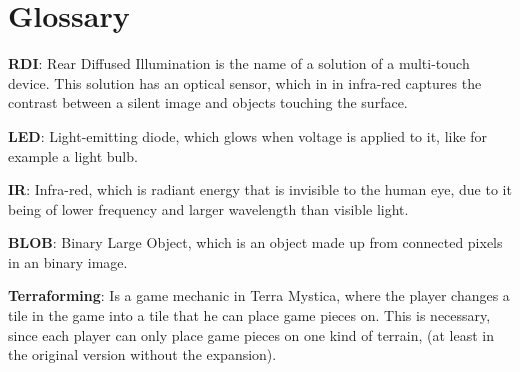 \chapter*{Glossary}\label{gloss}

\textbf{RDI}: Rear Diffused Illumination is the name of a solution of a multi-touch device\citep{multiTT}. This solution has an optical sensor, which in in infra-red captures the contrast between a silent image and objects touching the surface. 

\textbf{LED}: Light-emitting diode, which glows when voltage is applied to it, like for example a light bulb.

\textbf{IR}: Infra-red, which is radiant energy that is invisible to the human eye, due to it being of lower frequency and larger wavelength than visible light.

\textbf{BLOB}: Binary Large Object, which is an object made up from connected pixels in an binary image. 

\textbf{Terraforming}: Is a game mechanic in Terra Mystica, where the player changes a tile in the game into a tile that he can place game pieces on. This is necessary, since each player can only place game pieces on one kind of terrain, (at least in the original version without the expansion).